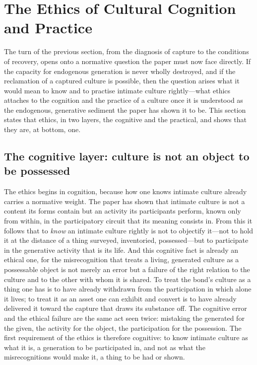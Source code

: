 \section{The Ethics of Cultural Cognition and Practice}
\label{p24:sec:ethics}

\noindent
The turn of the previous section, from the diagnosis of capture to the conditions of recovery, opens onto a normative question the paper must now face directly. If the capacity for endogenous generation is never wholly destroyed, and if the reclamation of a captured culture is possible, then the question arises what it would mean to know and to practise intimate culture rightly---what ethics attaches to the cognition and the practice of a culture once it is understood as the endogenous, generative sediment the paper has shown it to be. This section states that ethics, in two layers, the cognitive and the practical, and shows that they are, at bottom, one.

\subsection*{The cognitive layer: culture is not an object to be possessed}

The ethics begins in cognition, because how one knows intimate culture already carries a normative weight. The paper has shown that intimate culture is not a content its forms contain but an activity its participants perform, known only from within, in the participatory circuit that its meaning consists in. From this it follows that to \emph{know} an intimate culture rightly is not to objectify it---not to hold it at the distance of a thing surveyed, inventoried, possessed---but to participate in the generative activity that is its life. And this cognitive fact is already an ethical one, for the misrecognition that treats a living, generated culture as a possessable object is not merely an error but a failure of the right relation to the culture and to the other with whom it is shared. To treat the bond's culture as a thing one has is to have already withdrawn from the participation in which alone it lives; to treat it as an asset one can exhibit and convert is to have already delivered it toward the capture that draws its substance off. The cognitive error and the ethical failure are the same act seen twice: mistaking the generated for the given, the activity for the object, the participation for the possession. The first requirement of the ethics is therefore cognitive: to know intimate culture as what it is, a generation to be participated in, and not as what the misrecognitions would make it, a thing to be had or shown.

